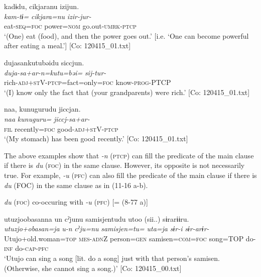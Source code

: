   \ex  
      \glll    kadɨdu,  cikjaranu  izijun.\\
      \textit{kam-tɨ=}  \textit{cikjara=nu}  \textit{izir-jur-}\\
      eat-\textsc{seq}=\textsc{foc}  power=\textsc{nom}  go.out-\textsc{umrk}-\textsc{ptcp}\\
\glt       ‘(One) eat (food), and then the power goes out.’ [i.e. ‘One can become powerful after eating a meal.’] [Co: 120415\_01.txt]

  \ex  
      \glll    dujasankutubəidu  siccjun.\\
      \textit{duja-sa+ar-n=kutu=bəi=}  \textit{sij-tur-}\\
      rich-\textsc{adj}+\textsc{st}V-\textsc{ptcp}=fact=only=\textsc{foc}  know-\textsc{prog}-PTCP\\
    \glt       ‘(I) know only the fact that (your grandparents) were rich.’ [Co: 120415\_01.txt]

  \ex{}

    
      \glll    naa,  kunugurudu  jiccjan.\\
      \textit{naa}  \textit{kunuguru=}  \textit{jiccj-sa+ar-}\\
      \textsc{fil}  recently=\textsc{foc}  good-\textsc{adj}+\textsc{st}V-\textsc{ptcp}\\
    \glt       ‘(My stomach) has been good recently.’ [Co: 120415\_01.txt]
\z
\z

The above examples show that \textit{-n} (\textsc{ptcp}) can fill the predicate of the main clause if there is \textit{du} (\textsc{foc}) in the same clause. However, its opposite is not necessarily true. For example, \textit{{}-u} (\textsc{pfc}) can also fill the predicate of the main clause if there is \textit{du} (FOC) in the same clause as in (11-16 a-b).

\ea\label{ex:11-16}  \textit{du} (\textsc{foc}) co-occuring with \textit{{}-u} (\textsc{pfc}) [= (8-77 a)]

  \ea  
      \glll    utuzjoobasanna  un  cˀjunu  samisjentudu  utoo  (sii..)  sɨrarɨɨru.  \\
      \textit{utuzjo+obasan=ja}  \textit{u-n}  \textit{cˀju=nu}  \textit{samisjen=tu=}  \textit{uta=ja}  \textit{sɨr-i}  \textit{sɨr-arɨr-}  \\
      Utujo+old.woman=\textsc{top}  \textsc{mes}-\textsc{adn}Z  person=\textsc{gen}  samisen=\textsc{com}=\textsc{foc} song=TOP  do-\textsc{inf}  do-\textsc{cap}-\textsc{pfc}  \\
      \glt       ‘Utujo can sing a song [lit. do a song] just with that person’s samisen. (Otherwise, she cannot sing a song.)’ [Co: 120415\_00.txt]


